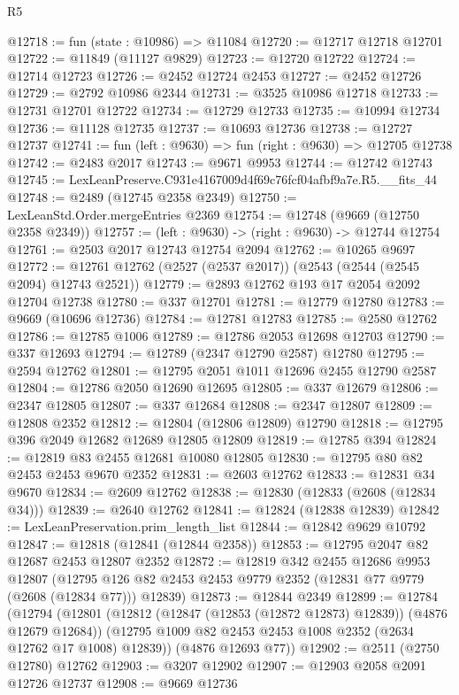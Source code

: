 \begin{lexlean}{R5}
\begin{coremodule}
@12718 := fun (state : @10986) => @11084
@12720 := @12717 @12718 @12701
@12722 := @11849 (@11127 @9829)
@12723 := @12720 @12722
@12724 := @12714 @12723
@12726 := @2452 @12724 @2453
@12727 := @2452 @12726
@12729 := @2792 @10986 @2344
@12731 := @3525 @10986 @12718
@12733 := @12731 @12701 @12722
@12734 := @12729 @12733
@12735 := @10994 @12734
@12736 := @11128 @12735
@12737 := @10693 @12736
@12738 := @12727 @12737
@12741 := fun (left : @9630) => fun (right : @9630) => @12705 @12738
@12742 := @2483 @2017
@12743 := @9671 @9953
@12744 := @12742 @12743
@12745 := LexLeanPreserve.C931e4167009d4f69c76fcf04afbf9a7e.R5.__fits_44
@12748 := @2489 (@12745 @2358 @2349)
@12750 := LexLeanStd.Order.mergeEntries @2369
@12754 := @12748 (@9669 (@12750 @2358 @2349))
@12757 := (left : @9630) -> (right : @9630) -> @12744 @12754
@12761 := @2503 @2017 @12743 @12754 @2094
@12762 := @10265 @9697
@12772 := @12761 @12762 (@2527 (@2537 @2017)) (@2543 (@2544 (@2545 @2094) @12743 @2521))
@12779 := @2893 @12762 @193 @17 @2054 @2092 @12704 @12738
@12780 := @337 @12701
@12781 := @12779 @12780
@12783 := @9669 (@10696 @12736)
@12784 := @12781 @12783
@12785 := @2580 @12762
@12786 := @12785 @1006
@12789 := @12786 @2053 @12698 @12703
@12790 := @337 @12693
@12794 := @12789 (@2347 @12790 @2587) @12780
@12795 := @2594 @12762
@12801 := @12795 @2051 @1011 @12696 @2455 @12790 @2587
@12804 := @12786 @2050 @12690 @12695
@12805 := @337 @12679
@12806 := @2347 @12805
@12807 := @337 @12684
@12808 := @2347 @12807
@12809 := @12808 @2352
@12812 := @12804 (@12806 @12809) @12790
@12818 := @12795 @396 @2049 @12682 @12689 @12805 @12809
@12819 := @12785 @394
@12824 := @12819 @83 @2455 @12681 @10080 @12805
@12830 := @12795 @80 @82 @2453 @2453 @9670 @2352
@12831 := @2603 @12762
@12833 := @12831 @34 @9670
@12834 := @2609 @12762
@12838 := @12830 (@12833 (@2608 (@12834 @34)))
@12839 := @2640 @12762
@12841 := @12824 (@12838 @12839)
@12842 := LexLeanPreservation.prim_length_list
@12844 := @12842 @9629 @10792
@12847 := @12818 (@12841 (@12844 @2358))
@12853 := @12795 @2047 @82 @12687 @2453 @12807 @2352
@12872 := @12819
    @342
    @2455
    @12686
    @9953
    @12807
    (@12795 @126 @82 @2453 @2453 @9779 @2352 (@12831 @77 @9779 (@2608 (@12834 @77))) @12839)
@12873 := @12844 @2349
@12899 := @12784
    (@12794
      (@12801
        (@12812 (@12847 (@12853 (@12872 @12873) @12839)) (@4876 @12679 @12684))
        (@12795 @1009 @82 @2453 @2453 @1008 @2352 (@2634 @12762 @17 @1008) @12839))
      (@4876 @12693 @77))
@12902 := @2511 (@2750 @12780) @12762
@12903 := @3207 @12902
@12907 := @12903 @2058 @2091 @12726 @12737
@12908 := @9669 @12736

\end{coremodule}
\end{lexlean}
